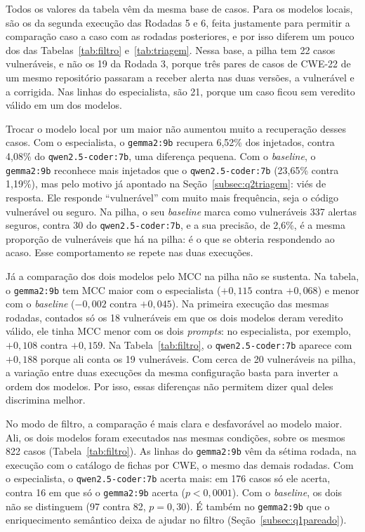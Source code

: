 Todos os valores da tabela vêm da mesma base de casos. Para os modelos locais, são os da segunda execução das Rodadas 5 e 6, feita justamente para permitir a comparação caso a caso com as rodadas posteriores, e por isso diferem um pouco dos das Tabelas~\ref{tab:filtro} e~\ref{tab:triagem}. Nessa base, a pilha tem 22 casos vulneráveis, e não os 19 da Rodada 3, porque três pares de casos de CWE-22 de um mesmo repositório passaram a receber alerta nas duas versões, a vulnerável e a corrigida. Nas linhas do especialista, são 21, porque um caso ficou sem veredito válido em um dos modelos.

{\sloppy Trocar o modelo local por um maior não aumentou muito a recuperação desses casos. Com o especialista, o \texttt{gemma2:9b} recupera 6,52\% dos injetados, contra 4,08\% do \texttt{qwen2.5-coder:7b}, uma diferença pequena. Com o \textit{baseline}, o \texttt{gemma2:9b} reconhece mais injetados que o \texttt{qwen2.5-coder:7b} (23,65\% contra 1,19\%), mas pelo motivo já apontado na Seção~\ref{subsec:q2triagem}: viés de resposta. Ele responde ``vulnerável'' com muito mais frequência, seja o código vulnerável ou seguro. Na pilha, o seu \textit{baseline} marca como vulneráveis 337 alertas seguros, contra 30 do \texttt{qwen2.5-coder:7b}, e a sua precisão, de 2,6\%, é a mesma proporção de vulneráveis que há na pilha: é o que se obteria respondendo ao acaso. Esse comportamento se repete nas duas execuções.\par}

Já a comparação dos dois modelos pelo MCC na pilha não se sustenta. Na tabela, o \texttt{gemma2:9b} tem MCC maior com o especialista ($+0{,}115$ contra $+0{,}068$) e menor com o \textit{baseline} ($-0{,}002$ contra $+0{,}045$). Na primeira execução das mesmas rodadas, contados só os 18 vulneráveis em que os dois modelos deram veredito válido, ele tinha MCC menor com os dois \textit{prompts}: no especialista, por exemplo, $+0{,}108$ contra $+0{,}159$. Na Tabela~\ref{tab:filtro}, o \texttt{qwen2.5-coder:7b} aparece com $+0{,}188$ porque ali conta os 19 vulneráveis. Com cerca de 20 vulneráveis na pilha, a variação entre duas execuções da mesma configuração basta para inverter a ordem dos modelos. Por isso, essas diferenças não permitem dizer qual deles discrimina melhor.

No modo de filtro, a comparação é mais clara e desfavorável ao modelo maior. Ali, os dois modelos foram executados nas mesmas condições, sobre os mesmos 822 casos (Tabela~\ref{tab:filtro}). As linhas do \texttt{gemma2:9b} vêm da sétima rodada, na execução com o catálogo de fichas por CWE, o mesmo das demais rodadas. Com o especialista, o \texttt{qwen2.5-coder:7b} acerta mais: em 176 casos só ele acerta, contra 16 em que só o \texttt{gemma2:9b} acerta ($p < 0{,}0001$). Com o \textit{baseline}, os dois não se distinguem (97 contra 82, $p = 0{,}30$). É também no \texttt{gemma2:9b} que o enriquecimento semântico deixa de ajudar no filtro (Seção~\ref{subsec:q1pareado}).

